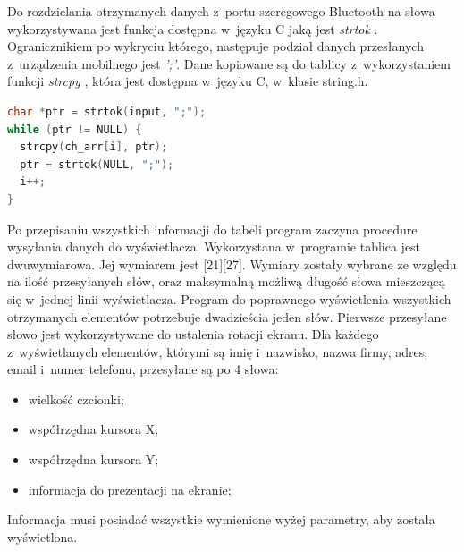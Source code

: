 \documentclass[a4paper,12pt, twoside]{article}
\begin{document}
    	Do rozdzielania otrzymanych danych z~portu szeregowego Bluetooth na słowa wykorzystywana jest funkcja dostępna w~języku C jaką jest \textit{strtok} \cite{strtok}. \label{petladekod}Ogranicznikiem po wykryciu którego, następuje podział danych przesłanych z~urządzenia mobilnego jest \textit{';'}. Dane kopiowane są do tablicy z~wykorzystaniem funkcji \textit{strcpy} \cite{strcpy}, która jest dostępna w~języku C, w~klasie string.h. 
    \begin{lstlisting}[language=C++, label={lst:petlaprzepisujaca}, caption=Działanie pętli przepisującej otrzymane dane do tablicy]
char *ptr = strtok(input, ";");
while (ptr != NULL) {
  strcpy(ch_arr[i], ptr);
  ptr = strtok(NULL, ";");
  i++;
}\end{lstlisting}
    
        Po przepisaniu wszystkich informacji do tabeli program zaczyna procedure wysyłania danych do wyświetlacza. Wykorzystana w~programie tablica jest dwuwymiarowa. Jej wymiarem jest [21][27]. Wymiary zostały wybrane ze względu na ilość przesyłanych słów,  oraz maksymalną możliwą długość słowa mieszczącą się w~jednej linii wyświetlacza. Program do poprawnego wyświetlenia wszystkich otrzymanych elementów potrzebuje dwadzieścia jeden słów. Pierwsze przesyłane słowo jest wykorzystywane do ustalenia rotacji ekranu. Dla każdego z~wyświetlanych elementów, którymi są imię i~nazwisko, nazwa firmy, adres, email i~numer telefonu, przesyłane są po 4 słowa:
        \begin{itemize}
            \item wielkość czcionki;
            \item współrzędna kursora X;
            \item współrzędna kursora Y;
            \item informacja do prezentacji na ekranie;
        \end{itemize}
    
    	Informacja musi posiadać wszystkie wymienione wyżej parametry, aby została wyświetlona.
    	
\end{document}
